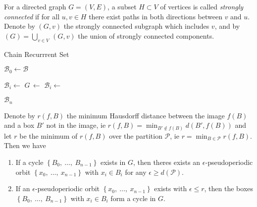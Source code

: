 \begin{definition}
    For a directed graph $G = (V, E)$, a subset $H \subset V$ of vertices is called 
    \emph{strongly connected} if for all $u, v \in H$ there exist paths in both 
    directions between $v$ and $u$. Denote by $(G, v)$ the strongly connected
    subgraph which includes $v$, and by 
    $(G) = \bigcup_{v \in V}\,$$(G, v)$ 
    the union of strongly connected components.
\end{definition}

\begin{algorithm}
    \caption{Chain Recurrrent Set}
    \label{alg:chain}

    \begin{algorithmic}[1]
        \State $\mathcal{B}_0 \gets \mathcal{B}$

            \State $\mathcal{B}_i \gets$ 
            \State $G\, \gets$ 
            \State $\mathcal{B}_i \gets$ 
        \EndFor

        \State \Return $\mathcal{B}_n$
    \end{algorithmic}
\end{algorithm}

\begin{proposition}
    Denote by $r(f, B)$ the minimum Hausdorff distance between the image $f(B)$ and a 
    box $B'$ not in the image, ie $r(f, B) = \min_{B' \notin f(B)} d(B', f(B))$ and let 
    $r$ be the minimum of $r(f, B)$ over the partition $\mathcal{P}$, ie 
    $r = \min_{B \in \mathcal{P}} r(f, B)$. Then we have

    \begin{enumerate}
        \item If a cycle $\left\{ B_0,\ \ldots,\ B_{n-1} \right\}$ exists in $G$, then 
        theres exists an $\epsilon$-pseudoperiodic orbit 
        $\left\{ x_0,\ \ldots,\ x_{n-1} \right\}$ with $x_i \in B_i$ for any 
        $\epsilon \geq d(\mathcal{P})$. 
        \item If an $\epsilon$-pseudoperiodic orbit 
        $\left\{ x_0,\ \ldots,\ x_{n-1} \right\}$ exists with $\epsilon \leq r$, then the 
        boxes $\left\{ B_0,\ \ldots,\ B_{n-1} \right\}$ with $x_i \in B_i$ form a cycle in 
        $G$. 
    \end{enumerate}

\end{proposition}

